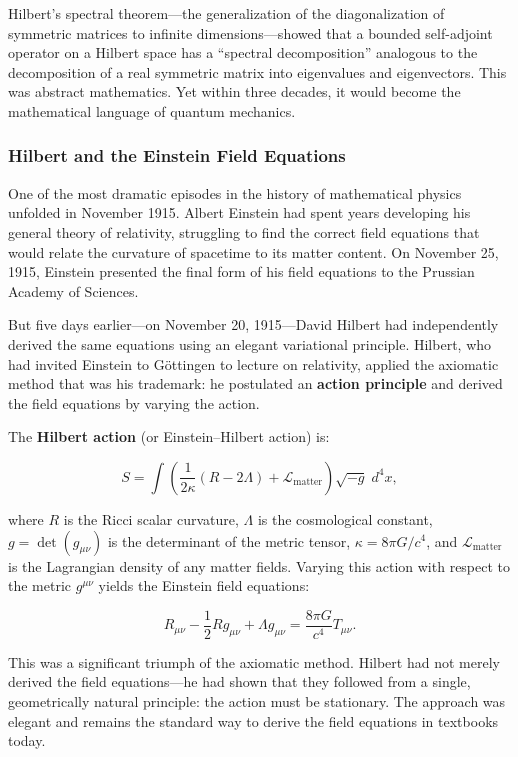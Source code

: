 Hilbert's spectral theorem---the generalization of the diagonalization of symmetric matrices to infinite dimensions---showed that a bounded self-adjoint operator on a Hilbert space has a ``spectral decomposition'' analogous to the decomposition of a real symmetric matrix into eigenvalues and eigenvectors. This was abstract mathematics. Yet within three decades, it would become the mathematical language of quantum mechanics.

\subsubsection{Hilbert and the Einstein Field Equations}

One of the most dramatic episodes in the history of mathematical physics unfolded in November 1915. Albert Einstein had spent years developing his general theory of relativity, struggling to find the correct field equations that would relate the curvature of spacetime to its matter content. On November 25, 1915, Einstein presented the final form of his field equations to the Prussian Academy of Sciences.

But five days earlier---on November 20, 1915---David Hilbert had independently derived the same equations using an elegant variational principle. Hilbert, who had invited Einstein to G\"ottingen to lecture on relativity, applied the axiomatic method that was his trademark: he postulated an \textbf{action principle} and derived the field equations by varying the action.

The \textbf{Hilbert action} (or Einstein--Hilbert action) is:

\[
S = \int \left( \frac{1}{2\kappa} (R - 2\Lambda) + \mathcal{L}_{\text{matter}} \right) \sqrt{-g} \; d^4x,
\]

where $R$ is the Ricci scalar curvature, $\Lambda$ is the cosmological constant, $g = \det(g_{\mu\nu})$ is the determinant of the metric tensor, $\kappa = 8\pi G / c^4$, and $\mathcal{L}_{\text{matter}}$ is the Lagrangian density of any matter fields. Varying this action with respect to the metric $g^{\mu\nu}$ yields the Einstein field equations:

\[
R_{\mu\nu} - \frac{1}{2}R g_{\mu\nu} + \Lambda g_{\mu\nu} = \frac{8\pi G}{c^4} T_{\mu\nu}.
\]

This was a significant triumph of the axiomatic method. Hilbert had not merely derived the field equations---he had shown that they followed from a single, geometrically natural principle: the action must be stationary. The approach was elegant and remains the standard way to derive the field equations in textbooks today.

